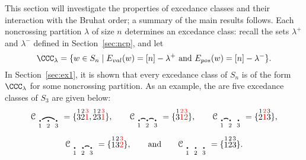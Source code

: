 \documentclass[12pt]{amsart}
\theoremstyle{definition}
\theoremstyle{remark}
\numberwithin{equation}{section}
\renewcommand{\setminus}{-}
\newcommand{\EP}{E_{pos}}
\newcommand{\EV}{E_{val}}
\begin{document}
This section will investigate the properties of excedance classes and their interaction with the Bruhat order; a summary of the main results follows.  Each noncrossing partition $\lambda$ of size $n$ determines an excedance class: recall the sets $\lambda^{+}$ and $\lambda^{-}$ defined in Section~\ref{sec:ncp}, and let
\[
\CCC_{\lambda} = \{ w \in S_{n} \;|\;  \text{$\EV(w) = [n] \setminus \lambda^{+}$ and $\EP(w) = [n] \setminus \lambda^{-}$}  \}.
\]
In Section~\ref{sec:ex1}, it is shown that every  excedance class of $S_{n}$ is of the form $\CCC_{\lambda}$ for some noncrossing partition.  As an example, the are five excedance classes of $S_{3}$ are given below:
\[
\mathcal{C}_{\begin{tikzpicture}[scale = 0.35, baseline = 0.35*-0.2]
\foreach \x in {1, ..., 3}{\draw[fill] (\x - 1, 0) circle (2pt) node[inner sep = 2pt] (\x) {};}
\foreach \x in {1, ..., 3}{\node[below] at (\x) {$\scriptstyle \x$};}
\foreach \i\j in {1/3}{\draw[thick] (\i) to[out = 35, in = 145] (\j);}
\end{tikzpicture}} = \{ \stackrel{1}{3}  \stackrel{2}{2} \color{red} \stackrel{3}{1} \color{black}, \stackrel{1}{2}\stackrel{2}{3} \color{red} \stackrel{3}{1} \color{black} \}, \qquad
\mathcal{C}_{\begin{tikzpicture}[scale = 0.35, baseline = 0.35*-0.2]
\foreach \x in {1, ..., 3}{\draw[fill] (\x - 1, 0) circle (2pt) node[inner sep = 2pt] (\x) {};}
\foreach \x in {1, ..., 3}{\node[below] at (\x) {$\scriptstyle \x$};}
\foreach \i\j in {1/2, 2/3}{\draw[thick] (\i) to[out = 35, in = 145] (\j);}
\end{tikzpicture}} = \{ \stackrel{1}{3} \color{red} \stackrel{2}{1} \stackrel{3}{2}  \color{black} \}, \qquad
\mathcal{C}_{\begin{tikzpicture}[scale = 0.35, baseline = 0.35*-0.2]
\foreach \x in {1, ..., 3}{\draw[fill] (\x - 1, 0) circle (2pt) node[inner sep = 2pt] (\x) {};}
\foreach \x in {1, ..., 3}{\node[below] at (\x) {$\scriptstyle \x$};}
\foreach \i\j in {1/2}{\draw[thick] (\i) to[out = 35, in = 145] (\j);}
\end{tikzpicture}} = \{\stackrel{1}{2}  \color{red} \stackrel{2}{1} \color{black}  \stackrel{3}{3}\}, 
\]
\[
\mathcal{C}_{\begin{tikzpicture}[scale = 0.35, baseline = 0.35*-0.2]
\foreach \x in {1, ..., 3}{\draw[fill] (\x - 1, 0) circle (2pt) node[inner sep = 2pt] (\x) {};}
\foreach \x in {1, ..., 3}{\node[below] at (\x) {$\scriptstyle \x$};}
\foreach \i\j in {2/3}{\draw[thick] (\i) to[out = 35, in = 145] (\j);}
\end{tikzpicture}} = \{\stackrel{1}{1} \stackrel{2}{3}  \color{red} \stackrel{3}{2} \color{black} \}, \qquad\text{and}\qquad
\mathcal{C}_{\begin{tikzpicture}[scale = 0.35, baseline = 0.35*-0.2]
\foreach \x in {1, ..., 3}{\draw[fill] (\x - 1, 0) circle (2pt) node[inner sep = 2pt] (\x) {};}
\foreach \x in {1, ..., 3}{\node[below] at (\x) {$\scriptstyle \x$};}
\end{tikzpicture}} = \{\stackrel{1}{1} \stackrel{2}{2} \stackrel{3}{3} \}.
\]
\end{document}

